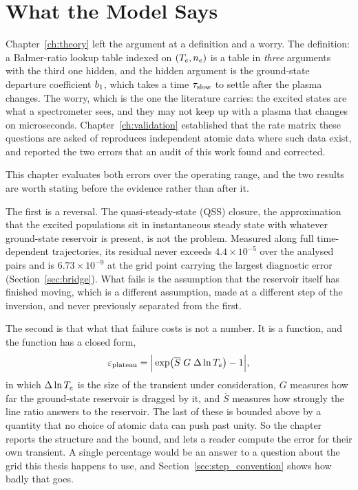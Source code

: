 
\chapter{What the Model Says}
\label{ch:results}

Chapter~\ref{ch:theory} left the argument at a definition and a worry. The
definition: a Balmer-ratio lookup table indexed on $(T_e,n_e)$ is a table in
\emph{three} arguments with the third one hidden, and the hidden argument is
the ground-state departure coefficient $b_1$, which takes a time $\tau_{\mathrm{slow}}$ to
settle after the plasma changes. The worry, which is the one the literature
carries: the excited states are what a spectrometer sees, and they may not keep
up with a plasma that changes on microseconds. Chapter~\ref{ch:validation}
established that the rate matrix these questions are asked of reproduces
independent atomic data where such data exist, and reported the two errors that
an audit of this work found and corrected.

This chapter evaluates both errors over the operating range, and the two
results are worth stating before the evidence rather than after it.

The first is a reversal. The quasi-steady-state (QSS) closure, the
approximation that the excited populations sit in instantaneous steady state
with whatever ground-state reservoir is present, is not the problem. Measured
along full time-dependent trajectories, its residual never exceeds
$4.4\times10^{-5}$ over the analysed pairs and is $6.73\times10^{-9}$ at the
grid point carrying the largest diagnostic error (Section~\ref{sec:bridge}).
What fails is the assumption that the reservoir itself has finished moving,
which is a different assumption, made at a different step of the inversion,
and never previously separated from the first.

The second is that what that failure costs is not a number. It is a function,
and the function has a closed form,
%
\begin{equation*}
  \varepsilon_{\mathrm{plateau}}
  = \Big|\exp\!\big(\overline{S}\;G\;\Delta\ln T_e\big) - 1\Big| ,
\end{equation*}
%
in which $\Delta\ln T_e$ is the size of the transient under consideration,
$G$ measures how far the ground-state reservoir is dragged by it, and
$\overline{S}$ measures how strongly the line ratio answers to the reservoir.
The last of these is bounded above by a quantity that no choice of atomic data
can push past unity. So the chapter reports the structure and the bound, and
lets a reader compute the error for their own transient. A single percentage
would be an answer to a question about the grid this thesis happens to use, and
Section~\ref{sec:step_convention} shows how badly that goes.

